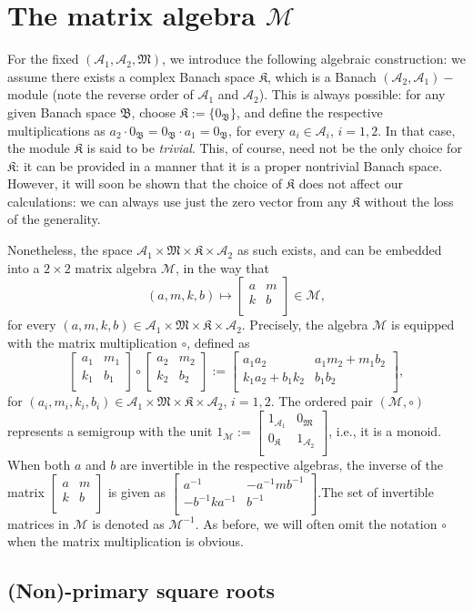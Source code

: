 \documentclass{article}
\theoremstyle{definition}
\def\A{{\mathcal{A}}}
\def\M{\mathfrak{M}}
\def\K{\mathfrak{K}}
\newcommand{\mat}[4]{\left[\begin{array}{cc}#1 & #2 \\ #3 & #4 \\
	\end{array}\right]}
\begin{document}
\section{The matrix algebra $\mathcal{M}$}\label{matrixalgebra} 


For the fixed $(\A_1,\A_2,\M)$, we introduce the following algebraic construction: we assume there exists a complex Banach space $\K$, which is  a Banach $(\A_2,\A_1)-$module (note the reverse order of $\A_1$ and $\A_2$). This is always possible: for any given Banach space $\mathfrak{B}$, choose $\K:=\{0_\mathfrak{B}\}$, and define the respective multiplications as $a_2\cdot0_\mathfrak{B}=0_\mathfrak{B}\cdot a_1=0_\mathfrak{B}$, for every $a_i\in\A_i$, $i=1,2$. In that case, the module $\K$ is said to be \emph{trivial}. This, of course, need not be the only choice for $\K$: it can be provided in a manner that it is a proper nontrivial Banach space. However, it will soon be shown that the choice of $\K$ does not affect our calculations: we can always use just the zero vector from any $\K$ without the loss of the generality.

Nonetheless, the space $\A_1\times \M\times \K\times \A_2$ as such exists, and can be embedded into a $2\times 2$ matrix algebra $\mathcal{M}$, in the way that
$$(a,m,k,b)\mapsto\mat{a}{m}{k}{b}\in\mathcal{M},$$
for every $(a,m,k,b)\in \A_1\times \M\times \K\times \A_2$. Precisely, the algebra $\mathcal{M}$ is equipped with the matrix multiplication $\circ$, defined as
$$\mat{a_1}{m_1}{k_1}{b_1}\circ\mat{a_2}{m_2}{k_2}{b_2}:=\mat{a_1a_2}{a_1m_2+m_1b_2}{k_1a_2+b_1k_2}{b_1b_2},$$
for $(a_i,m_i,k_i,b_i)\in \A_1\times \M\times \K\times \A_2$,  $i=1,2$.  The ordered pair $\left(\mathcal{M},\circ\right)$ represents a semigroup with the unit $1_{\mathcal{M}}:=\mat{1_{\A_1}}{0_{\M}}{0_{\K}}{1_{\A_2}}$, i.e., it is a monoid. When both $a$ and $b$ are invertible in the respective algebras, the inverse of the matrix $\mat{a}{m}{k}{b}$ is given as $\mat{a^{-1}}{-a^{-1}mb^{-1}}{-b^{-1}ka^{-1}}{b^{-1}}$.The set of invertible matrices in $\mathcal{M}$ is denoted as $\mathcal{M}^{-1}$. As before, we will often omit the notation $\circ$ when the matrix multiplication is obvious.

\subsection{(Non)-primary square roots}
\end{document}
